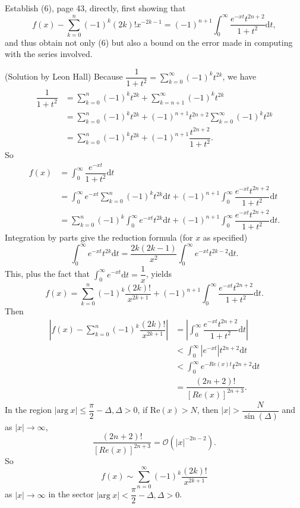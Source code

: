\begin{problem}\label{problem4chapter3}
Establish (6), page 43, directly, first showing that
$$f(x) - \displaystyle\sum_{k=0}^n (-1)^k (2k)! x^{-2k-1} = (-1)^{n+1} \displaystyle\int_0^{\infty} \dfrac{e^{-xt}t^{2n+2}}{1+t^2} \mathrm{d}t,$$
and thus obtain not only (6) but also a bound on the error made in computing with the series involved.
\end{problem}
\begin{solution}(Solution by Leon Hall)
Because $\dfrac{1}{1+t^2} = \displaystyle\sum_{k=0}^{\infty} (-1)^k t^{2k}$, we have
$$\begin{array}{ll}
\dfrac{1}{1+t^2} &= \displaystyle\sum_{k=0}^n (-1)^k t^{2k} + \displaystyle\sum_{k=n+1}^{\infty} (-1)^k t^{2k} \\
&=\displaystyle\sum_{k=0}^n (-1)^k t^{2k} + (-1)^{n+1} t^{2n+2} \displaystyle\sum_{k=0}^{\infty} (-1)^k t^{2k} \\
&=\displaystyle\sum_{k=0}^n (-1)^k t^{2k} + (-1)^{n+1} \dfrac{t^{2n+2}}{1+t^2}.
\end{array}$$
So
$$\begin{array}{ll}
f(x) &= \displaystyle\int_0^{\infty} \dfrac{e^{-xt}}{1+t^2} \mathrm{d}t \\
&= \displaystyle\int_0^{\infty} e^{-xt} \displaystyle\sum_{k=0}^n (-1)^k t^{2k} \mathrm{d}t + (-1)^{n+1} \displaystyle\int_0^{\infty} \dfrac{e^{-xt} t^{2n+2}}{1+t^2} \mathrm{d}t \\ 
&=\displaystyle\sum_{k=0}^n (-1)^k \displaystyle\int_0^{\infty} e^{-xt}t^{2k}\mathrm{d}t + (-1)^{n+1} \displaystyle\int_0^{\infty} \dfrac{e^{-xt}t^{2n+2}}{1+t^2} \mathrm{d}t.
\end{array}$$
Integration by parts give the reduction formula (for $x$ as specified)
$$\displaystyle\int_0^{\infty} e^{-xt}t^{2k} \mathrm{d}t = \dfrac{2k(2k-1)}{x^2} \displaystyle\int_0^{\infty}e^{-xt} t^{2k-2} \mathrm{d}t.$$
This, plus the fact that $\displaystyle\int_0^{\infty}e^{-xt}\mathrm{d}t = \dfrac{1}{x}$, yields
$$f(x) = \displaystyle\sum_{k=0}^n (-1)^k \dfrac{(2k)!}{x^{2k+1}} + (-1)^{n+1} \displaystyle\int_0^{\infty} \dfrac{e^{-xt} t^{2n+2}}{1+t^2} \mathrm{d}t.$$
Then
$$\begin{array}{ll}
\left| f(x) - \displaystyle\sum_{k=0}^n (-1)^k \dfrac{(2k)!}{x^{2k+1}} \right| &= \left| \displaystyle\int_0^{\infty} \dfrac{e^{-xt} t^{2n+2}}{1+t^2} \mathrm{d}t \right| \\
&< \displaystyle\int_0^{\infty} |e^{-xt}| t^{2n+2} \mathrm{d}t \\
&< \displaystyle\int_0^{\infty} e^{-Re(x)t} t^{2n+2} \mathrm{d}t \\
&= \dfrac{(2n+2)!}{[Re(x)]^{2n+3}}.
\end{array}$$
In the region $|\mathrm{arg \hspace{3pt}} x| \leq \dfrac{\pi}{2} - \Delta, \Delta > 0$, if $\mathrm{Re}(x) > N$, then $|x| > \dfrac{N}{\sin(\Delta)}$ and as $|x| \rightarrow \infty$,
$$\dfrac{(2n+2)!}{[Re(x)]^{2n+3}} = \mathcal{O} \left( |x|^{-2n-2} \right).$$
So
$$f(x) \sim \displaystyle\sum_{n=0}^{\infty} (-1)^k \dfrac{(2k)!}{x^{2k+1}}$$
as $|x| \rightarrow \infty$ in the sector $|\mathrm{arg \hspace{3pt}} x| < \dfrac{\pi}{2} - \Delta, \Delta > 0$.
\end{solution}
